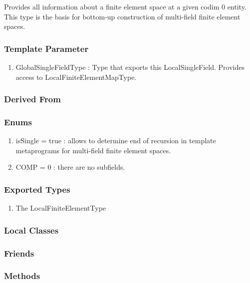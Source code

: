 \documentclass[11pt,a4paper,DIV11,%
notitlepage,oneside,abstracton,%
bibtotoc]{scrartcl}
\begin{document}
Provides all information about a finite element space at a given codim
0 entity. This type is the basis for bottom-up construction of
multi-field finite element spaces.

\subsubsection{Template Parameter}

\begin{enumerate}[1)]
\item GlobalSingleFieldType : Type that exports this
  LocalSingleField. Provides access to LocalFiniteElementMapType.
\end{enumerate}

\subsubsection{Derived From}

\subsubsection{Enums}

\begin{enumerate}[1)]
\item isSingle = true : allows to determine end of recursion in
  template metaprograms for multi-field finite element spaces.
\item COMP = 0 : there are no subfields.
\end{enumerate}

\subsubsection{Exported Types}

\begin{enumerate}[1)]
\item The LocalFiniteElementType
\end{enumerate}

\subsubsection{Local Classes}

\subsubsection{Friends}

\subsubsection{Methods}
\end{document}
